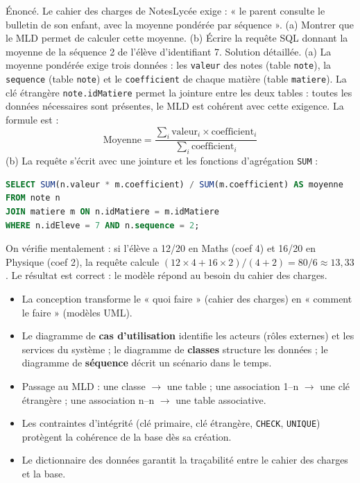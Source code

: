 \documentclass[11pt]{article}
\begin{document}
\begin{exoresolu}
Énoncé. Le cahier des charges de NotesLycée exige : « le parent consulte le bulletin de son enfant, avec la moyenne pondérée par séquence ». (a) Montrer que le MLD permet de calculer cette moyenne. (b) Écrire la requête SQL donnant la moyenne de la séquence 2 de l'élève d'identifiant 7.
\tcblower
Solution détaillée. (a) La moyenne pondérée exige trois données : les \texttt{valeur} des notes (table \texttt{note}), la \texttt{sequence} (table \texttt{note}) et le \texttt{coefficient} de chaque matière (table \texttt{matiere}). La clé étrangère \texttt{note.idMatiere} permet la jointure entre les deux tables : toutes les données nécessaires sont présentes, le MLD est cohérent avec cette exigence. La formule est :
\[ \text{Moyenne} = \frac{\sum_{i} \text{valeur}_i \times \text{coefficient}_i}{\sum_{i} \text{coefficient}_i} \]
(b) La requête s'écrit avec une jointure et les fonctions d'agrégation \texttt{SUM} :
\begin{lstlisting}[language=SQL]
SELECT SUM(n.valeur * m.coefficient) / SUM(m.coefficient) AS moyenne
FROM note n
JOIN matiere m ON n.idMatiere = m.idMatiere
WHERE n.idEleve = 7 AND n.sequence = 2;
\end{lstlisting}
On vérifie mentalement : si l'élève a 12/20 en Maths (coef 4) et 16/20 en Physique (coef 2), la requête calcule $(12 \times 4 + 16 \times 2) / (4 + 2) = 80/6 \approx 13,33$. Le résultat est correct : le modèle répond au besoin du cahier des charges.
\end{exoresolu}

\begin{aretenir}
\begin{itemize}
\item La conception transforme le « quoi faire » (cahier des charges) en « comment le faire » (modèles UML).
\item Le diagramme de \textbf{cas d'utilisation} identifie les acteurs (rôles externes) et les services du système ; le diagramme de \textbf{classes} structure les données ; le diagramme de \textbf{séquence} décrit un scénario dans le temps.
\item Passage au MLD : une classe $\to$ une table ; une association 1--n $\to$ une clé étrangère ; une association n--n $\to$ une table associative.
\item Les contraintes d'intégrité (clé primaire, clé étrangère, \texttt{CHECK}, \texttt{UNIQUE}) protègent la cohérence de la base dès sa création.
\item Le dictionnaire des données garantit la traçabilité entre le cahier des charges et la base.
\end{itemize}
\end{aretenir}
\end{document}
